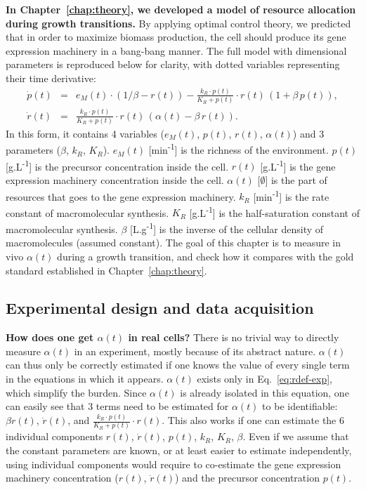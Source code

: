 \textbf{In Chapter~\ref{chap:theory}, we developed a model of resource allocation during growth transitions.}
By applying optimal control theory, we predicted that in order to maximize biomass production, the cell should produce its gene expression machinery in a bang-bang manner.
The full model with dimensional parameters is reproduced below for clarity, with dotted variables representing their time derivative:
\begin{eqnarray}
\dot{p}(t) &=& e_M(t)\cdot (1/\beta - r(t)) - \frac{k_R \cdot p(t)}{K_R + p(t)}\cdot r(t) \, (1+\beta\, p(t)), \label{eq:pdef-exp}\\
\dot{r}(t) &=& \frac{k_R \cdot p(t)}{K_R + p(t)}\cdot r(t) \, (\alpha(t) - \beta\, r(t)). \label{eq:rdef-exp}
\end{eqnarray}
In this form, it contains 4 variables ($e_M(t)$, $p(t)$, $r(t)$, $\alpha (t)$) and 3 parameters ($\beta$, $k_R$, $K_R$).
$e_M(t)$ [min\textsuperscript{-1}] is the richness of the environment.
$p(t)$ [g.L\textsuperscript{-1}] is the precursor concentration inside the cell.
$r(t)$ [g.L\textsuperscript{-1}] is the gene expression machinery concentration inside the cell.
$\alpha (t)$ [$\emptyset$] is the part of resources that goes to the gene expression machinery.
$k_R$ [min\textsuperscript{-1}] is the rate constant of macromolecular synthesis.
$K_R$ [g.L\textsuperscript{-1}] is the half-saturation constant of macromolecular synthesis.
$\beta$ [L.g\textsuperscript{-1}] is the inverse of the cellular density of macromolecules (assumed constant).
The goal of this chapter is to measure in vivo $\alpha (t)$ during a growth transition, and check how it compares with the gold standard established in Chapter~\ref{chap:theory}.

\subsection{Experimental design and data acquisition}

\textbf{How does one get $\alpha (t)$ in real cells?}
There is no trivial way to directly measure $\alpha (t)$ in an experiment, mostly because of its abstract nature.
$\alpha (t)$ can thus only be correctly estimated if one knows the value of every single term in the equations in which it appears.
$\alpha (t)$ exists only in Eq.~\ref{eq:rdef-exp}, which simplify the burden.
Since $\alpha (t)$ is already isolated in this equation, one can easily see that 3 terms need to be estimated for $\alpha (t)$ to be identifiable: $\beta r(t)$, $\dot{r}(t)$, and $\frac{k_R \cdot p(t)}{K_R + p(t)} \cdot r(t)$.
This also works if one can estimate the 6 individual components $r(t)$, $\dot{r}(t)$, $p(t)$, $k_R$, $K_R$, $\beta$.
Even if we assume that the constant parameters are known, or at least easier to estimate independently, using individual components would require to co-estimate the gene expression machinery concentration ($r(t)$, $\dot{r}(t)$) and the precursor concentration $p(t)$.

